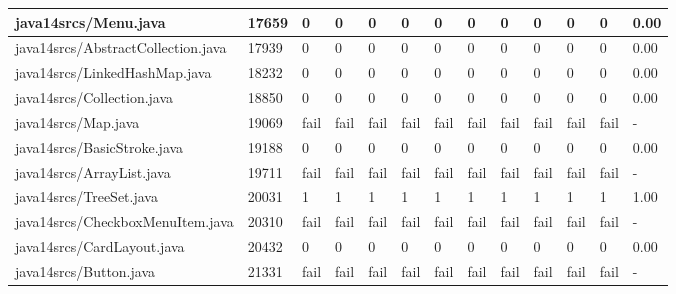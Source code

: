 \begin{tabular}{|l|l|l|l|l|l|l|l|l|l|l|l|l|}
\hline
java14srcs/Menu.java                               & 17659       & 0         & 0         & 0         & 0         & 0         & 0         & 0         & 0         & 0         & 0         & 0.00      \\
\hline
java14srcs/AbstractCollection.java                 & 17939       & 0         & 0         & 0         & 0         & 0         & 0         & 0         & 0         & 0         & 0         & 0.00      \\
\hline
java14srcs/LinkedHashMap.java                      & 18232       & 0         & 0         & 0         & 0         & 0         & 0         & 0         & 0         & 0         & 0         & 0.00      \\
\hline
java14srcs/Collection.java                         & 18850       & 0         & 0         & 0         & 0         & 0         & 0         & 0         & 0         & 0         & 0         & 0.00      \\
\hline
java14srcs/Map.java                                & 19069       & fail      & fail      & fail      & fail      & fail      & fail      & fail      & fail      & fail      & fail      & -         \\
\hline
java14srcs/BasicStroke.java                        & 19188       & 0         & 0         & 0         & 0         & 0         & 0         & 0         & 0         & 0         & 0         & 0.00      \\
\hline
java14srcs/ArrayList.java                          & 19711       & fail      & fail      & fail      & fail      & fail      & fail      & fail      & fail      & fail      & fail      & -         \\
\hline
java14srcs/TreeSet.java                            & 20031       & 1         & 1         & 1         & 1         & 1         & 1         & 1         & 1         & 1         & 1         & 1.00      \\
\hline
java14srcs/CheckboxMenuItem.java                   & 20310       & fail      & fail      & fail      & fail      & fail      & fail      & fail      & fail      & fail      & fail      & -         \\
\hline
java14srcs/CardLayout.java                         & 20432       & 0         & 0         & 0         & 0         & 0         & 0         & 0         & 0         & 0         & 0         & 0.00      \\
\hline
java14srcs/Button.java                             & 21331       & fail      & fail      & fail      & fail      & fail      & fail      & fail      & fail      & fail      & fail      & -         \\

\end{tabular}
